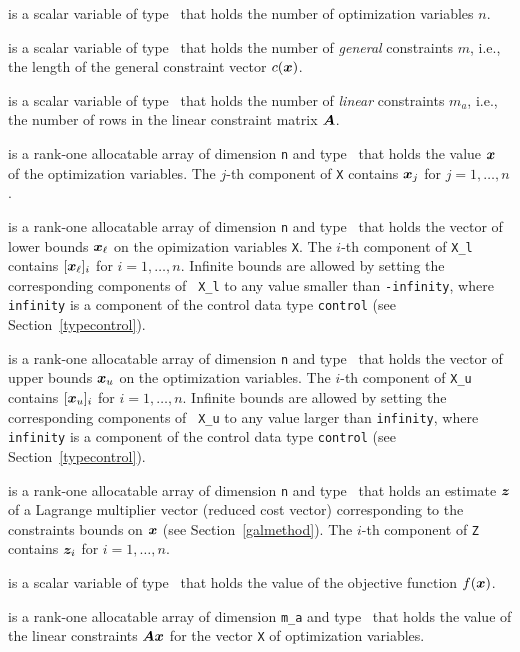 \documentclass{galahad}
\begin{document}
\begin{description}

 is a scalar variable of type \integer\ 
 that holds the number of optimization variables $n$.

 is a scalar variable of type \integer\
 that holds the number of {\em general} constraints $m$, i.e., the length
 of the general constraint vector $c({\bm{x}})$.

 is a scalar variable of type \integer\ 
 that holds the number of {\em linear} constraints $m_a$, i.e., the number
 of rows in the linear constraint matrix ${\bm{A}}$.

\ittf{X} is a rank-one allocatable array of dimension {\tt n} and type 
\realdp\ that holds the value ${\bm{x}}$ of the optimization variables.
The $j$-th component of {\tt X} contains
${\bm{x}}_{j}$ for $j = 1,  \ldots , n$.

\ittf{X\_l} is a rank-one allocatable array of dimension {\tt n}
and type \realdp\ that holds the vector of lower bounds
${\bm{x}}_\ell$ on the opimization variables {\tt X}. The $i$-th component of
{\tt X\_l} contains $[{\bm{x}}_\ell]_i$ for $i = 1, \ldots , n$.  Infinite
bounds are allowed by setting the corresponding components of {\tt
  X\_l} to any value smaller than {\tt -infinity}, where {\tt
  infinity} is a component of the control data type {\tt control} (see
Section~\ref{typecontrol}).

\ittf{X\_u}  is a rank-one allocatable array of dimension {\tt n}
and type \realdp\ that holds the vector of upper bounds
${\bm{x}}_u$ on the optimization variables.  The $i$-th component of
{\tt X\_u} contains $[{\bm{x}}_u]_i$ for $i = 1, \ldots , n$.  Infinite
bounds are allowed by setting the corresponding components of {\tt
  X\_u} to any value larger than {\tt infinity}, where {\tt
  infinity} is a component of the control data type {\tt control} (see
Section~\ref{typecontrol}).

\ittf{Z} is a rank-one allocatable array of dimension {\tt n} and type 
\realdp\ that holds an estimate ${\bm{z}}$ of a Lagrange
multiplier vector (reduced cost vector) corresponding to the
constraints bounds on ${\bm{x}}$ (see Section~\ref{galmethod}).
The $i$-th component of {\tt Z} contains ${\bm{z}}_{i}$ for $i = 1,
\ldots , n$.

\ittf{X\_status}

 is a scalar variable of type 
\realdp\ that holds the value of the objective function $f({\bm{x}})$.

\ittf{Ax} is a rank-one allocatable array of dimension {\tt m\_a}
and type \realdp\ that holds the value of the linear
constraints ${\bm{A}}{\bm{x}}$ for the vector {\tt X} of optimization variables.   


\end{description}
\end{document}
